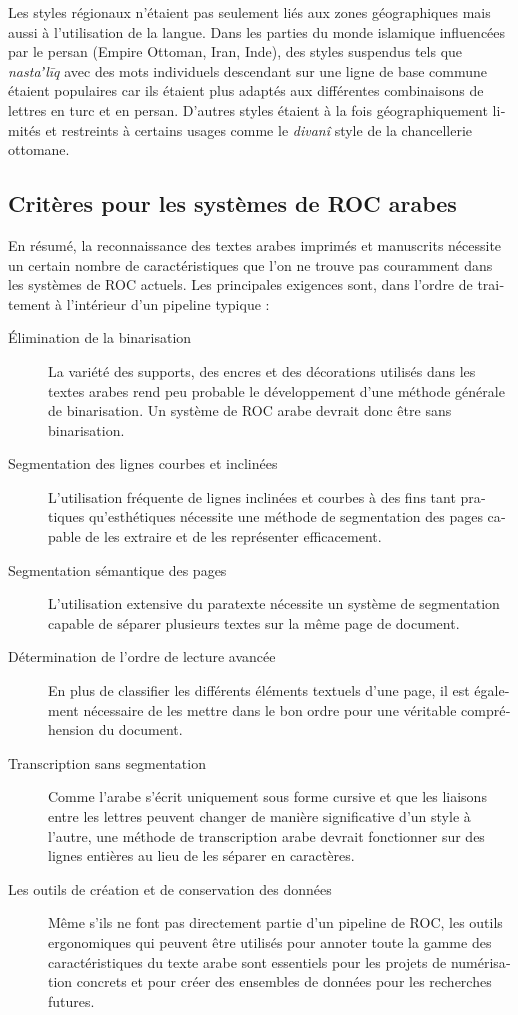\begin{french}
Les styles régionaux n'étaient pas seulement liés aux zones géographiques mais
aussi à l'utilisation de la langue.  Dans les parties du monde islamique
influencées par le persan (Empire Ottoman, Iran, Inde), des styles suspendus
tels que \emph{nastaʼlīq} avec des mots individuels descendant sur une ligne de
base commune étaient populaires car ils étaient plus adaptés aux différentes
combinaisons de lettres en turc et en persan. D'autres styles étaient à la fois
géographiquement limités et restreints à certains usages comme le
\emph{divanî} style de la chancellerie ottomane.

\subsection{Critères pour les systèmes de ROC arabes}

En résumé, la reconnaissance des textes arabes imprimés et manuscrits nécessite
un certain nombre de caractéristiques que l'on ne trouve pas couramment dans
les systèmes de ROC actuels. Les principales exigences sont, dans l'ordre de
traitement à l'intérieur d'un pipeline typique :

\begin{description}
	\item[Élimination de la binarisation] La variété des supports, des encres et des décorations utilisés
		dans les textes arabes rend peu probable le développement d'une
		méthode générale de binarisation. Un système de ROC arabe devrait
		donc être sans binarisation.
	\item[Segmentation des lignes courbes et inclinées] L'utilisation
		fréquente de lignes inclinées et courbes à des fins tant
		pratiques qu'esthétiques nécessite une méthode de segmentation
		des pages capable de les extraire et de les représenter
		efficacement.
	\item[Segmentation sémantique des pages] L'utilisation extensive du
		paratexte nécessite un système de segmentation capable de
		séparer plusieurs textes sur la même page de document.
	\item[Détermination de l'ordre de lecture avancée] En plus de
		classifier les différents éléments textuels d'une page, il est
		également nécessaire de les mettre dans le bon ordre pour une
		véritable compréhension du document.
	\item[Transcription sans segmentation] Comme l'arabe s'écrit uniquement
		sous forme cursive et que les liaisons entre les lettres
		peuvent changer de manière significative d'un style à l'autre,
		une méthode de transcription arabe devrait fonctionner sur des
		lignes entières au lieu de les séparer en caractères.
	\item[Les outils de création et de conservation des données]
		Même s'ils ne font pas directement partie d'un pipeline de ROC,
		les outils ergonomiques qui peuvent être utilisés pour annoter
		toute la gamme des caractéristiques du texte arabe sont
		essentiels pour les projets de numérisation concrets et pour
		créer des ensembles de données pour les recherches futures.
\end{description}


\end{french}
